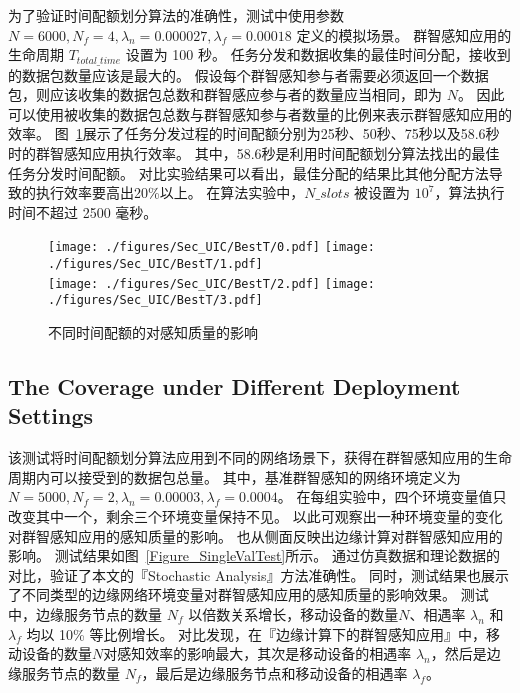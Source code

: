 为了验证时间配额划分算法的准确性，测试中使用参数 $N=6000, N_f=4, \lambda_n = 0.000027, \lambda_f=0.00018$ 定义的模拟场景。
群智感知应用的生命周期 $T_{total\_time}$ 设置为 100 秒。
任务分发和数据收集的最佳时间分配，接收到的数据包数量应该是最大的。
假设每个群智感知参与者需要必须返回一个数据包，则应该收集的数据包总数和群智感应参与者的数量应当相同，即为 $N$。
因此可以使用被收集的数据包总数与群智感知参与者数量的比例来表示群智感知应用的效率。
图~\ref{Figure_BestT}展示了任务分发过程的时间配额分别为25秒、50秒、75秒以及58.6秒时的群智感知应用执行效率。
其中，58.6秒是利用时间配额划分算法找出的最佳任务分发时间配额。
对比实验结果可以看出，最佳分配的结果比其他分配方法导致的执行效率要高出20\%以上。
在算法实验中，$N\_slots$ 被设置为 $10^7$，算法执行时间不超过 2500 毫秒。

\begin{figure}[!h]
  \centering
  {\texttt{[image: ./figures/Sec\_UIC/BestT/0.pdf]}}
  {\texttt{[image: ./figures/Sec\_UIC/BestT/1.pdf]}}\\
  {\texttt{[image: ./figures/Sec\_UIC/BestT/2.pdf]}}
  {\texttt{[image: ./figures/Sec\_UIC/BestT/3.pdf]}}
  \vspace{-1em}
  \caption{不同时间配额的对感知质量的影响}
  \label{Figure_BestT}
\end{figure}

\subsection{The Coverage under Different Deployment Settings}

该测试将时间配额划分算法应用到不同的网络场景下，获得在群智感知应用的生命周期内可以接受到的数据包总量。
其中，基准群智感知的网络环境定义为 $N=5000, N_f=2, \lambda_n = 0.00003, \lambda_f=0.0004$。
在每组实验中，四个环境变量值只改变其中一个，剩余三个环境变量保持不见。
以此可观察出一种环境变量的变化对群智感知应用的感知质量的影响。
也从侧面反映出边缘计算对群智感知应用的影响。
测试结果如图~\ref{Figure_SingleValTest}所示。
通过仿真数据和理论数据的对比，验证了本文的『Stochastic Analysis』方法准确性。
同时，测试结果也展示了不同类型的边缘网络环境变量对群智感知应用的感知质量的影响效果。
测试中，边缘服务节点的数量 $N_f$ 以倍数关系增长，移动设备的数量$N$、相遇率 $\lambda_n$ 和 $\lambda_f$ 均以 10\% 等比例增长。
对比发现，在『边缘计算下的群智感知应用』中，移动设备的数量$N$对感知效率的影响最大，其次是移动设备的相遇率 $\lambda_n$，然后是边缘服务节点的数量 $N_f$，最后是边缘服务节点和移动设备的相遇率 $\lambda_f$。

